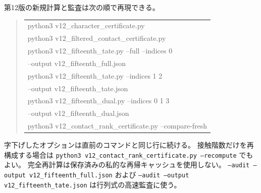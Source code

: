 \documentclass[a4paper,11pt]{ltjsarticle}
\theoremstyle{definition}
\begin{document}
第12版の新規計算と監査は次の順で再現できる。
\begin{quote}\footnotesize\ttfamily
\begin{tabular}{@{}l@{}}
python3 v12\_character\_certificate.py\\
python3 v12\_filtered\_contact\_certificate.py\\
python3 v12\_fifteenth\_tate.py --full --indices 0\\
\quad --output v12\_fifteenth\_full.json\\
python3 v12\_fifteenth\_tate.py --indices 1 2\\
\quad --output v12\_fifteenth\_tate.json\\
python3 v12\_fifteenth\_dual.py --indices 0 1 3\\
\quad --output v12\_fifteenth\_dual.json\\
python3 v12\_contact\_rank\_certificate.py --compare-fresh\\
\end{tabular}
\end{quote}
字下げしたオプションは直前のコマンドと同じ行に続ける。
接触階数だけを再構成する場合は
\texttt{python3 v12\_contact\_rank\_certificate.py --recompute} でもよい。
完全再計算は保存済みの私的な再帰キャッシュを使用しない。
\texttt{--audit --output v12\_fifteenth\_full.json} および
\texttt{--audit --output v12\_fifteenth\_tate.json} は行列式の高速監査に使う。
\end{document}
